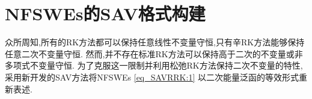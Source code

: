 
\section{NFSWEs的SAV格式构建}\label{Section_SAVRRK: 2}

众所周知,所有的RK方法都可以保持任意线性不变量守恒,只有辛RK方法能够保持任意二次不变量守恒.
然而,并不存在标准RK方法可以保持高于二次的不变量或非多项式不变量守恒.
为了克服这一限制并利用松弛RK方法保持二次不变量的特性,采用新开发的SAV方法将NFSWEs \eqref{eq_SAVRRK:1} 以二次能量泛函的等效形式重新表述.

